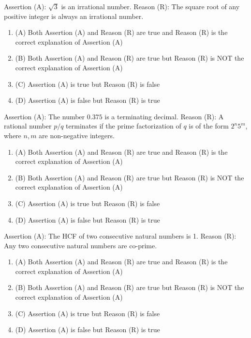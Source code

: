 \documentclass[12pt,a4paper]{exam}
\begin{document}
\begin{questions}
\question[1] Assertion (A): $\sqrt{3}$ is an irrational number. Reason (R): The square root of any positive integer is always an irrational number.
\begin{enumerate}[label=(\Alph*)]
  \item (A) Both Assertion (A) and Reason (R) are true and Reason (R) is the correct explanation of Assertion (A)
  \item (B) Both Assertion (A) and Reason (R) are true but Reason (R) is NOT the correct explanation of Assertion (A)
  \item (C) Assertion (A) is true but Reason (R) is false
  \item (D) Assertion (A) is false but Reason (R) is true
\end{enumerate}
\vspace{0.15cm}

\question[1] Assertion (A): The number $0.375$ is a terminating decimal. Reason (R): A rational number $p/q$ terminates if the prime factorization of $q$ is of the form $2^n 5^m$, where $n, m$ are non-negative integers.
\begin{enumerate}[label=(\Alph*)]
  \item (A) Both Assertion (A) and Reason (R) are true and Reason (R) is the correct explanation of Assertion (A)
  \item (B) Both Assertion (A) and Reason (R) are true but Reason (R) is NOT the correct explanation of Assertion (A)
  \item (C) Assertion (A) is true but Reason (R) is false
  \item (D) Assertion (A) is false but Reason (R) is true
\end{enumerate}
\vspace{0.15cm}

\question[1] Assertion (A): The HCF of two consecutive natural numbers is 1. Reason (R): Any two consecutive natural numbers are co-prime.
\begin{enumerate}[label=(\Alph*)]
  \item (A) Both Assertion (A) and Reason (R) are true and Reason (R) is the correct explanation of Assertion (A)
  \item (B) Both Assertion (A) and Reason (R) are true but Reason (R) is NOT the correct explanation of Assertion (A)
  \item (C) Assertion (A) is true but Reason (R) is false
  \item (D) Assertion (A) is false but Reason (R) is true
\end{enumerate}
\vspace{0.15cm}


\end{questions}
\end{document}
